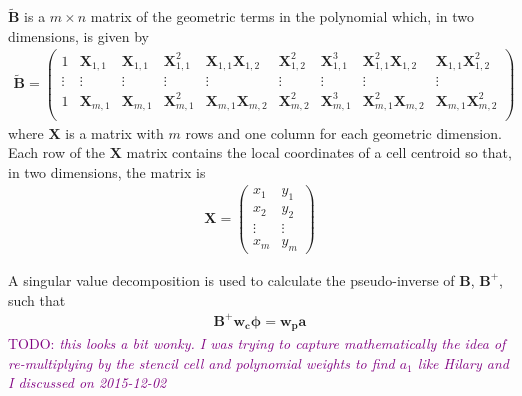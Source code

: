\documentclass{article}
\newcommand{\TODO}[1]{\textcolor{purple}{TODO: \emph{#1}}}
\begin{document}
$\mathbf{\tilde{B}}$ is a $m \times n$ matrix of the geometric terms in the polynomial which, in two dimensions, is given by
\begin{align}
	\mathbf{\tilde{B}} = 
	\begin{pmatrix}
		1 & \mathbf{X}_{1,1} & \mathbf{X}_{1,1} & \mathbf{X}_{1,1}^2 & \mathbf{X}_{1,1} \mathbf{X}_{1,2} & \mathbf{X}_{1,2}^2 & \mathbf{X}_{1,1}^3 & \mathbf{X}_{1,1}^2 \mathbf{X}_{1,2} & \mathbf{X}_{1,1} \mathbf{X}_{1,2}^2 \\
		\vdots & \vdots & \vdots & \vdots & \vdots & \vdots & \vdots & \vdots & \vdots \\
		1 & \mathbf{X}_{m,1} & \mathbf{X}_{m,1} & \mathbf{X}_{m,1}^2 & \mathbf{X}_{m,1} \mathbf{X}_{m,2} & \mathbf{X}_{m,2}^2 & \mathbf{X}_{m,1}^3 & \mathbf{X}_{m,1}^2 \mathbf{X}_{m,2} & \mathbf{X}_{m,1} \mathbf{X}_{m,2}^2 \\
	\end{pmatrix}
\end{align}
where $\mathbf{X}$ is a matrix with $m$ rows and one column for each geometric dimension.  
Each row of the $\mathbf{X}$ matrix contains the local coordinates of a cell centroid so that, in two dimensions, the matrix is
\begin{align}
	\mathbf{X} = 
	\begin{pmatrix}
		x_1 & y_1 \\
		x_2 & y_2 \\
		\vdots & \vdots \\
		x_m & y_m
	\end{pmatrix}
\end{align}

A singular value decomposition is used to calculate the pseudo-inverse of $\mathbf{B}$, $\mathbf{B}^+$, such that
\begin{align}
	\mathbf{B}^+ \mathbf{w_c} \bm{\phi} = \mathbf{w_p} \mathbf{a}
\end{align}
\TODO{this looks a bit wonky.  I was trying to capture mathematically the idea of re-multiplying by the stencil cell and polynomial weights to find $a_1$ like Hilary and I discussed on 2015-12-02}



\end{document}
